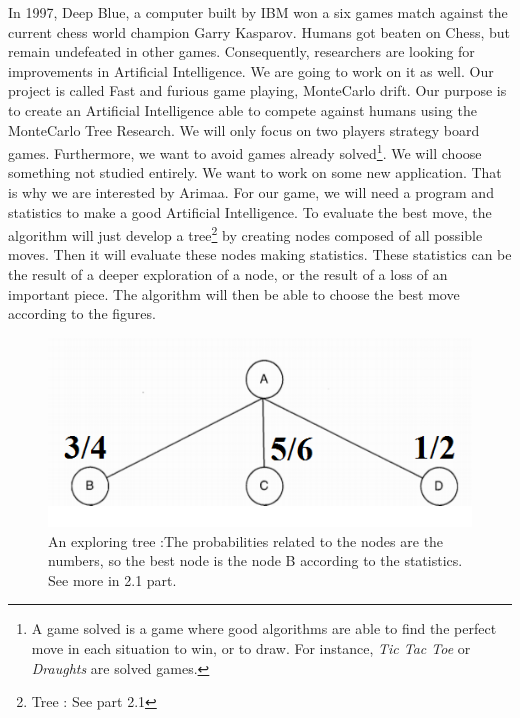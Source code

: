 
In 1997, Deep Blue, a computer built by IBM won a six games match against the current
chess world champion Garry Kasparov. Humans got beaten on Chess, but remain undefeated in other games. Consequently, researchers are looking for improvements in Artificial Intelligence. We are going to work on it as well.
\newline
\newline
Our project is called Fast and furious game playing, MonteCarlo drift. Our purpose is to create an Artificial Intelligence able to compete against humans using the MonteCarlo Tree Research.
\newline
We will only focus on two players strategy board games. Furthermore, we want to avoid games already solved\footnote{A game solved is a game where good algorithms are able to find the perfect move in each situation to win, or to draw. For instance, \textit{Tic Tac Toe} or \textit{Draughts} are solved games.}. We will choose something not studied entirely. We want to work on some new application. That is why we are interested by Arimaa.
\newline
\newline
For our game, we will need a program and statistics to make a good Artificial Intelligence. To evaluate the best move, the algorithm will just develop a tree\footnote{Tree : See part 2.1} by creating nodes composed of all possible moves. Then it will evaluate these nodes making statistics. These statistics can be the result of a deeper exploration of a node, or the result of a loss of an important piece. The algorithm will then be able to choose the best move according to the figures.
\smallbreak
\begin{figure}[!h] 
\centerline{\includegraphics[scale=0.50]{1_Presentation/1.1_Our_project_Dan/tree}}
  \caption{An exploring tree :\newline The probabilities related to the nodes are the numbers, so the best node is the node B according to the statistics. See more in 2.1 part.}
  \centering
\end{figure}
